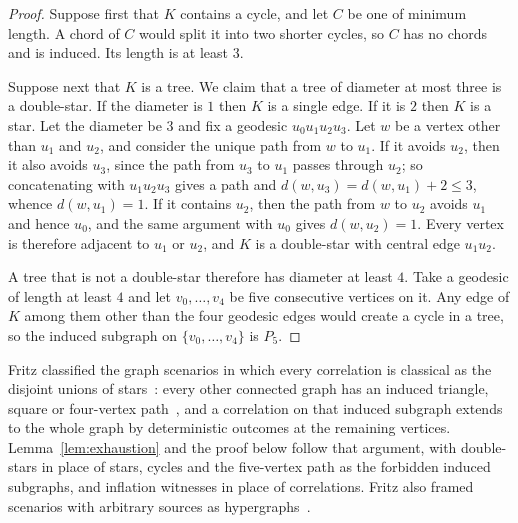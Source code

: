 \begin{proof}
Suppose first that $K$ contains a cycle, and let $C$ be one of minimum length. A chord of $C$ would split it into two shorter cycles, so $C$ has no chords and is induced. Its length is at least $3$.

Suppose next that $K$ is a tree. We claim that a tree of diameter at most three is a double-star. If the diameter is $1$ then $K$ is a single edge. If it is $2$ then $K$ is a star. Let the diameter be $3$ and fix a geodesic $u_0u_1u_2u_3$. Let $w$ be a vertex other than $u_1$ and $u_2$, and consider the unique path from $w$ to $u_1$. If it avoids $u_2$, then it also avoids $u_3$, since the path from $u_3$ to $u_1$ passes through $u_2$; so concatenating with $u_1u_2u_3$ gives a path and $d(w,u_3)=d(w,u_1)+2\le3$, whence $d(w,u_1)=1$. If it contains $u_2$, then the path from $w$ to $u_2$ avoids $u_1$ and hence $u_0$, and the same argument with $u_0$ gives $d(w,u_2)=1$. Every vertex is therefore adjacent to $u_1$ or $u_2$, and $K$ is a double-star with central edge $u_1u_2$.

A tree that is not a double-star therefore has diameter at least $4$. Take a geodesic of length at least $4$ and let $v_0,\dots,v_4$ be five consecutive vertices on it. Any edge of $K$ among them other than the four geodesic edges would create a cycle in a tree, so the induced subgraph on $\{v_0,\dots,v_4\}$ is $P_5$.
\end{proof}

Fritz classified the graph scenarios in which every correlation is classical as the disjoint unions of stars~\cite[Theorem 3.8]{Fritz2012}: every other connected graph has an induced triangle, square or four-vertex path~\cite[Lemma 3.9]{Fritz2012}, and a correlation on that induced subgraph extends to the whole graph by deterministic outcomes at the remaining vertices. Lemma~\ref{lem:exhaustion} and the proof below follow that argument, with double-stars in place of stars, cycles and the five-vertex path as the forbidden induced subgraphs, and inflation witnesses in place of correlations. Fritz also framed scenarios with arbitrary sources as hypergraphs~\cite[Section 3]{Fritz2012}.

